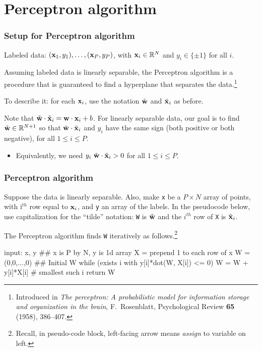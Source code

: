 \documentclass{beamer}
\theoremstyle{example}
\newcommand{\ct}[1]{\lstinline[language=Python,basicstyle=\ttfamily\footnotesize,stringstyle=\small\color{strings}]!#1!}
\begin{document}
\section{Perceptron algorithm}

\begin{frame}
    \frametitle{Setup for Perceptron algorithm}
    Labeled data: $({\bf x}_1, y_1), \ldots, ({\bf x}_P, y_P)$, with ${\bf x}_i\in\mathbb R^N$ and $y_i\in\{\pm1\}$ for all $i$.

    Assuming labeled data is linearly separable, the Perceptron algorithm is a procedure that is guaranteed to find a hyperplane that separates the data.\footnote{Introduced in \textit{The perceptron: A probabilistic model for information storage and organization in the brain}, F.~Rosenblatt, Psychological Review \textbf{65} (1958), 386{--}407.}
    
    \pause
    To describe it: for each ${\bf x}_i$, use the notation $\tilde{\bf w}$ and $\tilde{\bf x}_i$ as before.

    \pause
    Note that $\tilde{\bf w}\cdot\tilde{\bf x}_i = {\bf w}\cdot{\bf x}_i + b$. For linearly separable data, our goal is to find $\tilde{\bf w}\in\mathbb R^{N+1}$ so that $\tilde{\bf w}\cdot \tilde{\bf x}_i$ and $y_i$ have the same sign (both positive or both negative), for all $1\le i\le P$.
    \begin{itemize}
        \item Equivalently, we need $y_i\ \tilde{\bf w}\cdot \tilde{\bf x}_i > 0$ for all $1\le i\le P$.
    \end{itemize}
\end{frame}

\begin{frame}[fragile]
\frametitle{Perceptron algorithm}
Suppose the data is linearly separable. Also, make \ct{x} be a $P\times N$ array of points, with i$^{th}$ row equal to ${\bf x}_i$, and \ct{y} an array of the labels. In the pseudocode below, use capitalization for the ``tilde'' notation: \ct{W} is $\tilde{\bf w}$ and the $i^{th}$ row of \ct{X} is $\tilde{\bf x}_i$. 

The Perceptron algorithm finds \ct{W} iteratively as follows.\footnote{Recall, in pseudo-code block, left-facing arrow means \textit{assign} to variable on left.}
\pause 

\begin{pseudo}
input: x, y  ## x is P by N, y is 1d array
X = prepend 1 to each row of x
W = (0,0,...,0)  ## Initial W
while (exists i with y[i]*dot(W, X[i]) <= 0){
    W = W + y[i]*X[i] # smallest such i
}
return W
\end{pseudo}

\end{frame}
\end{document}
